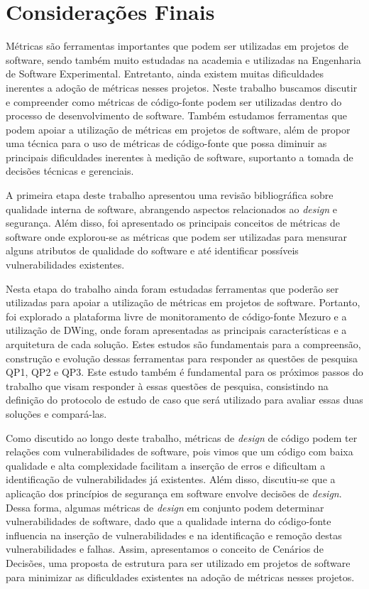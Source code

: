 \chapter{Considerações Finais}
\label{cap-consideracoesFinais}

Métricas são ferramentas importantes que podem ser utilizadas em projetos de software, sendo também muito estudadas na academia e utilizadas na Engenharia de Software Experimental. Entretanto, ainda existem muitas dificuldades inerentes a adoção de métricas nesses projetos. Neste trabalho buscamos discutir e compreender como métricas de código-fonte podem ser utilizadas dentro do processo de desenvolvimento de software. Também estudamos ferramentas que podem apoiar a utilização de métricas em projetos de software, além de propor uma técnica para o uso de métricas de código-fonte que possa diminuir as principais dificuldades inerentes à medição de software, suportanto a tomada de decisões técnicas e gerenciais.

%

A primeira etapa deste trabalho apresentou uma revisão bibliográfica sobre qualidade interna de software, abrangendo aspectos relacionados ao \emph{design} e segurança. Além disso, foi apresentado os principais conceitos de métricas de software onde explorou-se as métricas que podem ser utilizadas para mensurar alguns atributos de qualidade do software e até identificar possíveis vulnerabilidades existentes.

%

Nesta etapa do trabalho ainda foram estudadas ferramentas que poderão ser utilizadas para apoiar a utilização de métricas em projetos de software. Portanto, foi explorado a plataforma livre de monitoramento de código-fonte Mezuro e a utilização de DWing, onde foram apresentadas as principais características e a arquitetura de cada solução. Estes estudos são fundamentais para a compreensão, construção e evolução dessas ferramentas para responder as questões de pesquisa QP1, QP2 e QP3. Este estudo também é fundamental para os próximos passos do trabalho que visam responder à essas questões de pesquisa, consistindo na definição do protocolo de estudo de caso que será utilizado para avaliar essas duas soluções e compará-las.

%


Como discutido ao longo deste trabalho, métricas de \emph{design} de código podem ter relações com  vulnerabilidades de software, pois vimos que um código com baixa qualidade e alta complexidade facilitam a inserção de erros e dificultam a identificação de vulnerabilidades já existentes. Além disso, discutiu-se que a aplicação dos princípios de segurança em software envolve decisões de \emph{design}. Dessa forma, algumas métricas de \emph{design} em conjunto podem determinar vulnerabilidades de software, dado que a qualidade interna do código-fonte influencia na inserção de vulnerabilidades e na identificação e remoção destas vulnerabilidades e falhas. Assim, apresentamos o conceito de Cenários de Decisões, uma proposta de estrutura para ser utilizado em projetos de software para minimizar as dificuldades existentes na adoção de métricas nesses projetos.

